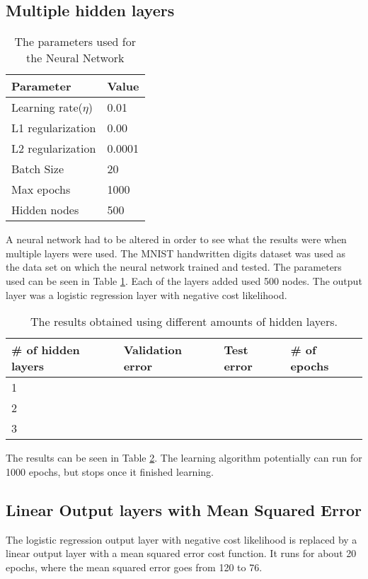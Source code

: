 
\subsection*{Multiple hidden layers}

\begin{table}[!h]
\centering
\label{parameters1}
\begin{tabular}{ll}
\textbf{Parameter}           & \textbf{Value} \\ \hline  
Learning rate($\eta$) & 0.01   \\
L1 regularization   & 0.00   \\
L2 regularization   & 0.0001 \\
Batch Size          & 20     \\
Max epochs          & 1000   \\
Hidden nodes        & 500   
\end{tabular}
\caption{The parameters used for the Neural Network}
\end{table}

A neural network had to be altered in order to see what the results were when multiple layers were used. The MNIST handwritten digits dataset was used as the data set on which the neural network trained and tested. The parameters used can be seen in Table \ref{parameters1}. Each of the layers added used 500 nodes. The output layer was a logistic regression layer with negative cost likelihood.

\begin{table}[!h]
\centering
\label{results}
\begin{tabular}{llll}
\textbf{\# of hidden layers} & \textbf{Validation error} & \textbf{Test error} & \textbf{\# of epochs} \\ \hline
1                            &                           &                     &                       \\
2                            &                           &                     &                       \\
3                            &                           &                     &                      
\end{tabular}
\caption{The results obtained using different amounts of hidden layers.}
\end{table}

The results can be seen in Table \ref{results}. The learning algorithm potentially can run for 1000 epochs, but stops once it finished learning.

\subsection*{Linear Output layers with Mean Squared Error}

The logistic regression output layer with negative cost likelihood is replaced by a linear output layer with a mean squared error cost function. It runs for about 20 epochs, where the mean squared error goes from 120 to 76.